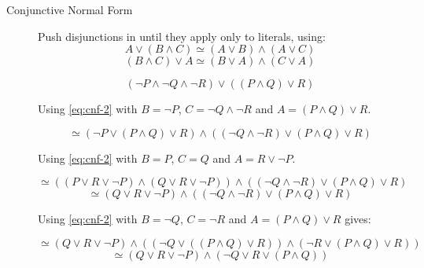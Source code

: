 \documentclass{supervision}
\begin{document}
\begin{questions}
\begin{parts}
\begin{solution}
            \begin{description}
              \item[Conjunctive Normal Form]
                Push disjunctions in until they apply only to literals, using:
                \begin{equation}
                  \label{eq:cnf-1}
                  A \lor (B \land C) \simeq (A \lor B) \land (A \lor C)
                \end{equation}
                \begin{equation}
                  \label{eq:cnf-2}
                  (B \land C) \lor A \simeq (B \lor A) \land (C \lor A)
                \end{equation}

                \begin{equation*}
                  (\lnot P \land \lnot Q \land \lnot R) \lor ((P \land Q) \lor R)
                \end{equation*}

                Using \eqref{eq:cnf-2} with $B = \lnot P$, $C = \lnot Q \land
                \lnot R$ and $A = (P \land Q) \lor R$.

                \begin{equation*}
                    \simeq (\lnot P \lor (P \land Q) \lor R) \land
                    ((\lnot Q \land \lnot R) \lor (P \land Q) \lor R)
                \end{equation*}

                Using \eqref{eq:cnf-2} with $B = P$, $C =Q$ and
                $A = R \lor \lnot P$.

                \begin{equation*}
                    \simeq ((P \lor R \lor \lnot P) \land (Q \lor R \lor \lnot P)) \land
                    ((\lnot Q \land \lnot R) \lor (P \land Q) \lor R)
                \end{equation*}
                \begin{equation*}
                    \simeq (Q \lor R \lor \lnot P) \land
                    ((\lnot Q \land \lnot R) \lor (P \land Q) \lor R)
                \end{equation*}


                Using \eqref{eq:cnf-2} with $B = \lnot Q$, $C = \lnot R$ and
                $A = (P \land Q) \lor R$ gives:

                \begin{equation*}
                    \simeq (Q \lor R \lor \lnot P) \land
                    ((\lnot Q \lor ((P \land Q) \lor R)) \land (\lnot R \lor (P \land Q) \lor R))
                \end{equation*}
                \begin{equation*}
                    \simeq (Q \lor R \lor \lnot P) \land
                    (\lnot Q \lor R \lor (P \land Q))
                \end{equation*}


\end{description}
\end{solution}
\end{parts}
\end{questions}
\end{document}
